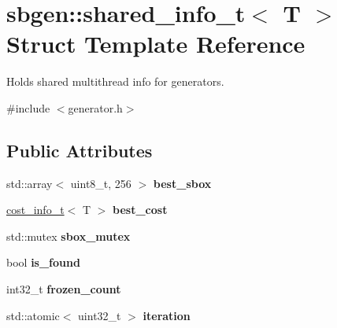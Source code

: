 \hypertarget{structsbgen_1_1shared__info__t}{}\section{sbgen\+:\+:shared\+\_\+info\+\_\+t$<$ T $>$ Struct Template Reference}
\label{structsbgen_1_1shared__info__t}


Holds shared multithread info for generators.  




{\ttfamily \#include $<$generator.\+h$>$}

\subsection*{Public Attributes}
\begin{DoxyCompactItemize}
\item 
\mbox{\label{structsbgen_1_1shared__info__t_a47476ebca87dbb9563fd99a91909954d}} 
std\+::array$<$ uint8\+\_\+t, 256 $>$ {\bfseries best\+\_\+sbox}
\item 
\mbox{\label{structsbgen_1_1shared__info__t_ab08fd04b6e0fdedd9c1d85b8f76e20f6}} 
\hyperlink{structsbgen_1_1cost__info__t}{cost\+\_\+info\+\_\+t}$<$ T $>$ {\bfseries best\+\_\+cost}
\item 
\mbox{\label{structsbgen_1_1shared__info__t_a39cfad18af39c2e1ae797dc204dd2372}} 
std\+::mutex {\bfseries sbox\+\_\+mutex}
\item 
\mbox{\label{structsbgen_1_1shared__info__t_a34b070cb3c1d2fbd608f6b9eae21414e}} 
bool {\bfseries is\+\_\+found}
\item 
\mbox{\label{structsbgen_1_1shared__info__t_a8275bab6b9f5a7357f25cb9d8c5fff55}} 
int32\+\_\+t {\bfseries frozen\+\_\+count}
\item 
\mbox{\label{structsbgen_1_1shared__info__t_a40a61021e094b40c63054186e927d023}} 
std\+::atomic$<$ uint32\+\_\+t $>$ {\bfseries iteration}
\end{DoxyCompactItemize}


